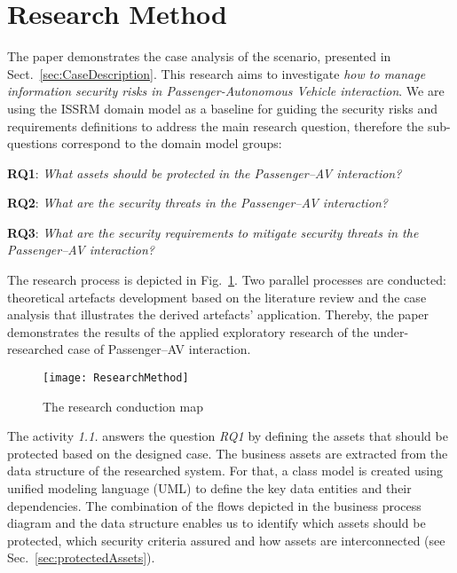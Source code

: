 \documentclass[manuscript]{acmart}
\begin{document}
\section{Research Method} \label{sec:ResearchMethod}

The paper demonstrates the case analysis of the scenario, presented in Sect.~\ref{sec:CaseDescription}. This research aims to investigate \textit{how to manage information security risks in Passenger-Autonomous Vehicle interaction}. We are using the ISSRM domain model as a baseline for guiding the security risks and requirements definitions to address the main research question, therefore the sub-questions correspond to the domain model groups: 

\textbf{RQ1}: \textit{What assets should be protected in the Passenger--AV interaction?}

\textbf{RQ2}: \textit{What are the security threats in the Passenger--AV interaction?} 

\textbf{RQ3}: \textit{What are the security requirements to mitigate security threats in the Passenger--AV interaction?}

The research process is depicted in Fig.~\ref{fig:ResearchMethodProcess}. Two parallel processes are conducted: theoretical artefacts development based on the literature review and the case analysis that illustrates the derived artefacts' application.
Thereby, the paper demonstrates the results of the applied exploratory research of the under-researched case of Passenger--AV interaction.

\begin{figure} [ht]
    \centering
    \texttt{[image: ResearchMethod]}
    \caption{The research conduction map~\cite{PassengerDataProtection}} \label{fig:ResearchMethodProcess}
\end{figure}

The activity \textit{1.1.} answers the question \textit{RQ1} by defining the assets that should be protected based on the designed case. The business assets are extracted from the data structure of the researched system. For that, a class model is created using unified modeling language (UML) to define the key data entities and their dependencies. The combination of the flows depicted in the business process diagram and the data structure enables us to identify which assets should be protected, which security criteria assured and how assets are interconnected (see Sec.~\ref{sec:protectedAssets}). 
\end{document}
